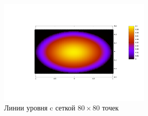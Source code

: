 \documentclass[oneside,final,14pt]{extreport}
\begin{document}
\begin{figure}[h!]
  \centering
  \includegraphics[width=0.65\textwidth]{picture4}
  \caption{Линии уровня c сеткой \( 80 \times 80 \) точек}
\end{figure}
\end{document}
